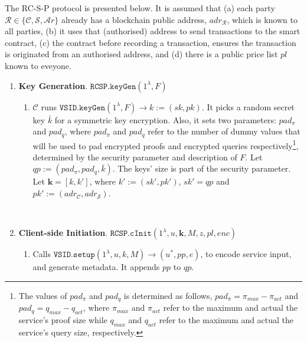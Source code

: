 The RC-S-P protocol is presented below. It is assumed that (a) each party $\mathcal{R} \in\{\mathcal{C,S,A}r\}$ already has a blockchain public address, $adr_{\scriptscriptstyle\mathcal{R}}$, which is known to all parties, (b) it uses that (authorised) address to send transactions to the smart contract,  (c) the contract   before recording a transaction, ensures the transaction is  originated from an authorised address, and (d) there is a public price list $pl$ known to eveyone.

\begin{enumerate}
\item \textbf{Key Generation}. $\mathtt{RCSP}.\mathtt{keyGen}(1^{\scriptscriptstyle\lambda}, F)$
\begin{enumerate}


\item  $\mathcal C$ runs  $\mathtt{VSID.keyGen}(1^{\lambda},F)\rightarrow k:=(sk,pk)$. It picks a random secret key  $\bar{k}$ for a symmetric key encryption. Also,  it sets two parameters: $pad_{\scriptscriptstyle \pi}$ and $pad_{\scriptscriptstyle q}$, where  $pad_{\scriptscriptstyle \pi}$ and $pad_{\scriptscriptstyle q}$  refer to the number of  dummy values that will be used to pad encrypted proofs and encrypted queries respectively\footnote{\scriptsize The values of  $pad_{\scriptscriptstyle \pi}$ and $pad_{\scriptscriptstyle q}$ is determined as follows, $pad_{\scriptscriptstyle \pi}=\pi_{\scriptscriptstyle max}-\pi_{\scriptscriptstyle act}$ and $pad_{\scriptscriptstyle q}=q_{\scriptscriptstyle max}-q_{\scriptscriptstyle act}$, where $\pi_{\scriptscriptstyle max}$ and $\pi_{\scriptscriptstyle act}$ refer to the maximum and actual the service's proof size  while $q_{\scriptscriptstyle max}$ and $q_{\scriptscriptstyle act}$ refer to the maximum and actual the service's query size, respectively.},  determined by the security parameter and description of $F$.  Let $qp:=(pad_{\scriptscriptstyle \pi},pad_{\scriptscriptstyle q}, \bar{k})$. The keys' size is part of the security parameter.  Let  $\bm{k}=[k,k']$, where $k':=(sk',pk')$,   $sk'=qp$ and $pk':=(adr_{\scriptscriptstyle\mathcal{C}},adr_{\scriptscriptstyle\mathcal{S}})$. 
\end{enumerate}

\

\item \textbf{Client-side Initiation}. $\mathtt{RCSP}.\mathtt{cInit}(1^\lambda, u,\bm{k}, M,z,pl,enc)$
\begin{enumerate}

\item Calls  $\mathtt{VSID.setup}(1^{\lambda}, u,k,M)\rightarrow (u^{\scriptscriptstyle *}, {pp},e)$, to encode  service input, and generate metadata. {It appends $pp$ to $qp$}.




\end{enumerate}
\end{enumerate}
